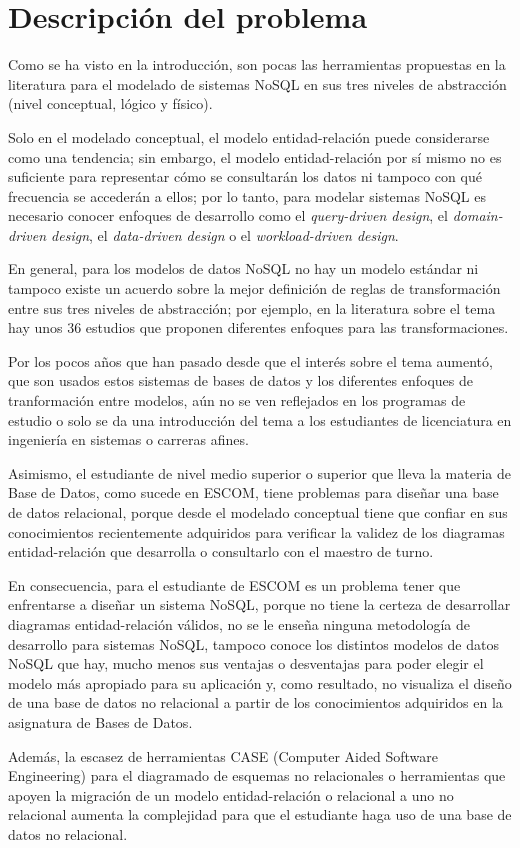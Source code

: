 \section{Descripción del problema}
Como se ha visto en la introducción, son pocas las herramientas propuestas en la literatura para el modelado de sistemas NoSQL en sus tres niveles de abstracción (nivel conceptual, lógico y físico).


Solo en el modelado conceptual, el modelo entidad-relación puede considerarse como una tendencia; sin embargo, el modelo entidad-relación por sí mismo no es suficiente para representar cómo se consultarán los datos ni tampoco con qué frecuencia se accederán a ellos; por lo tanto, para modelar sistemas NoSQL es necesario conocer enfoques de desarrollo como el \textit{query-driven design}, el \textit{domain-driven design}, el \textit{data-driven design} o el \textit{workload-driven design}.


En general, para los modelos de datos NoSQL no hay un modelo estándar ni tampoco existe un acuerdo sobre la mejor definición de reglas de transformación entre sus tres niveles de abstracción; por ejemplo, en la literatura sobre el tema hay unos 36 estudios\cite{martinez-mosquera_modeling_2020} que proponen diferentes enfoques para las transformaciones.


Por los pocos años que han pasado desde que el interés sobre el tema aumentó, que son usados estos sistemas de bases de datos y los diferentes enfoques de tranformación entre modelos, aún no se ven reflejados en los programas de estudio o solo se da una introducción del tema a los estudiantes de licenciatura en ingeniería en sistemas o carreras afines. 


Asimismo, el estudiante de nivel medio superior o superior que lleva la materia de Base de Datos, como sucede en ESCOM, tiene problemas para diseñar una base de datos relacional, porque desde el modelado conceptual tiene que confiar en sus conocimientos recientemente adquiridos para verificar la validez de los diagramas entidad-relación que desarrolla o consultarlo con el maestro de turno.


En consecuencia, para el estudiante de ESCOM es un problema tener que enfrentarse a diseñar un sistema NoSQL, porque no tiene la certeza de desarrollar diagramas entidad-relación válidos, no se le enseña ninguna metodología de desarrollo para sistemas NoSQL, tampoco conoce los distintos modelos de datos NoSQL que hay, mucho menos sus ventajas o desventajas para poder elegir el modelo más apropiado para su aplicación y, como resultado, no visualiza el diseño de una base de datos no relacional a partir de los conocimientos adquiridos en la asignatura de Bases de Datos.


Además, la escasez de herramientas CASE (Computer Aided Software Engineering) para el diagramado de esquemas no relacionales o herramientas que apoyen la migración de un modelo entidad-relación o relacional a uno no relacional aumenta la complejidad para que el estudiante haga uso de una base de datos no relacional.
